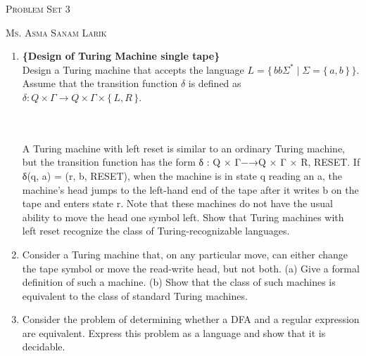 \documentclass[11pt, article, oneside]{memoir}
\newcommand{\set}[1]{\{\, #1\, \}}
\begin{document}
\begin{center}
\LARGE{\textsc{Problem Set 3}}
 
\large{\textsc{Ms. Asma Sanam Larik}}
\end{center}


\begin{enumerate}
    \item
    \textbf{\{Design of Turing Machine single tape\}}
    \\Design a Turing machine that accepts the language \(L = \set{ bb\Sigma^* \mid \Sigma = \set{a, b}}\). Assume that the transition function \( \delta \) is defined as \( \delta : Q × \Gamma \rightarrow Q × \Gamma × \set{L,R}\).




    \\
    \\A Turing machine with left reset is similar to an ordinary Turing machine, but the
transition function has the form
δ : Q × Γ−→Q × Γ × {R, RESET}.
If δ(q, a) = (r, b, RESET), when the machine is in state q reading an a, the machine’s head jumps to the left-hand end of the tape after it writes b on the tape and
enters state r. Note that these machines do not have the usual ability to move the
head one symbol left. Show that Turing machines with left reset recognize the class
of Turing-recognizable languages.

    \item 
    Consider a Turing machine that, on any particular move, can either change the tape symbol or
move the read-write head, but not both.
(a) Give a formal definition of such a machine.
(b) Show that the class of such machines is equivalent to the class of standard Turing machines.


    \item
    Consider the problem of determining whether a DFA and a regular expression are
equivalent. Express this problem as a language and show that it is decidable.
    

\end{enumerate}
\end{document}
